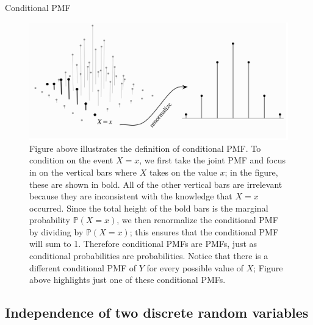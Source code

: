 \documentclass[8pt, usepdftitle = false]{beamer}
\begin{document}
\begin{frame}{Conditional PMF}
\begin{figure}
  \includegraphics[scale = .25]{Images/conditional_PMF.png}
    \caption{Figure above illustrates the definition of conditional PMF. To condition on the event $X=x$, we first take the joint PMF and focus in on the vertical bars where $X$ takes on the value $x$; in the figure, these are shown in bold. All of the other vertical bars are irrelevant because they are inconsistent with the knowledge that $X=x$ occurred. Since the total height of the bold bars is the marginal probability $\mathbb{P}(X=x)$, we then renormalize the conditional PMF by dividing by $\mathbb{P}(X=x)$; this ensures that the conditional PMF will sum to 1. Therefore conditional PMFs are PMFs, just as conditional probabilities are probabilities. Notice that there is a different conditional PMF of $Y$ for every possible value of $X$; Figure above highlights just one of these conditional PMFs.}
\end{figure}

\end{frame}


\subsection{Independence of two discrete random variables}
\end{document}
